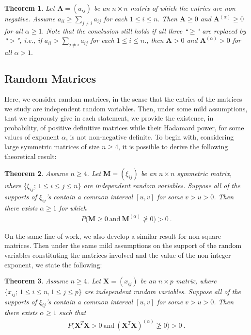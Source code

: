 \documentclass[conference,letterpaper]{IEEEtran}
\numberwithin{equation}{section}
\newcommand{\lbl}{\label}
\newcommand{\beaa}{\begin{eqnarray*}}
\newcommand{\eeaa}{\end{eqnarray*}}
\newtheorem{theorem}{{\sc Theorem}}
\begin{document}
\begin{theorem}\lbl{th:th1} Let $\mathbf{A}=(a_{ij})$ be an $n\times n$ matrix of which the entries are non-negative. Assume $a_{ii}\geq  \sum_{j\ne i}a_{ij}$ for each $1\leq i\leq n.$ Then $\mathbf{A} \geq 0$ and $\mathbf{A}^{(\alpha)}\geq  0$ for all $\alpha\geq 1.$ 
Note that the conclusion still holds if all three ``$\geq$" are replaced by ``$>$", \textit{i.e.}, if $a_{ii} >  \sum_{j\ne i}a_{ij}$ for each $1\leq i\leq n.$, then $\mathbf{A} > 0$ and $\mathbf{A}^{(\alpha)}>  0$ for all $\alpha> 1.$ 
\end{theorem}


\subsection{Random Matrices}
Here, we consider random matrices, in the sense that the entries of the matrices we study are independent random variables.
Then, under some mild assumptions, that we rigorously give in each statement, we provide the existence, in probability, of positive definitive matrices while their Hadamard power, for some values of exponent $\alpha$, is not non-negative definite.
To begin with, considering large symmetric matrices of size $n \geq 4$, it is possible to derive the following theoretical result:
\begin{theorem}\lbl{th:th2} Assume $n\geq 4$.   Let $\mathbf{M}=(\xi_{ij})$ be an $n\times n$ symmetric matrix, where $\{\xi_{ij};\, 1\leq i \leq j \leq n\}$ are independent random variables. 
Suppose all of the supports of $\xi_{ij}$'s contain  a common interval $[u, v]$ for some $v>u>0$. Then there exists $\alpha \geq 1$ for which
\beaa
P\big(\mathbf{M}\geq 0\ \mbox{and}\ \mathbf{M}^{(\alpha)} \ngeqslant 0\big)>0 \ .
\eeaa
\end{theorem}

On the same line of work, we also develop a similar result for non-square matrices. Then under the same mild assumptions on the support of the random variables constituting the matrices involved and the value of the non integer exponent, we state the following:
\begin{theorem}\lbl{th:th3} Assume $n\geq 4$.   Let $\mathbf{X}=(x_{ij})$ be an $n\times p$  matrix, where $\{x_{ij};\, 1\leq i \leq n, 1\leq j \leq p\}$ are independent random variables. Suppose all of the supports of $\xi_{ij}$'s contain  a common interval $[u, v]$ for some $v>u>0$. Then there exists $\alpha \geq 1$ such that
\beaa
P\big(\mathbf{X}^T\mathbf{X}>0\ \mbox{and}\ (\mathbf{X}^T\mathbf{X})^{(\alpha)}\ngeqslant 0\big)>0 \ .
\eeaa
\end{theorem}
\end{document}

